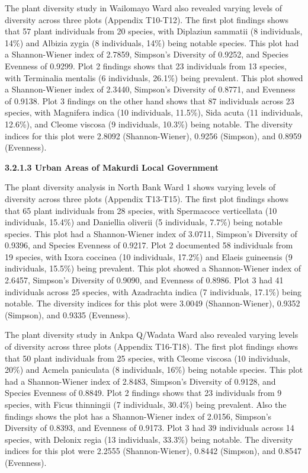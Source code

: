 The plant diversity study in Wailomayo Ward also revealed varying levels of diversity across three plots (Appendix T10-T12). The first plot findings shows that 57 plant individuals from 20 species, with Diplaziun sammatii (8 individuals, 14\%) and Albizia zygia (8 individuals, 14\%) being notable species. This plot had a Shannon-Wiener index of 2.7859, Simpson's Diversity of 0.9252, and Species Evenness of 0.9299. Plot 2 findings shows that 23 individuals from 13 species, with Terminalia mentalis (6 individuals, 26.1\%) being prevalent. This plot showed a Shannon-Wiener index of 2.3440, Simpson's Diversity of 0.8771, and Evenness of 0.9138. Plot 3 findings on the other hand shows that 87 individuals across 23 species, with Magnifera indica (10 individuals, 11.5\%), Sida acuta (11 individuals, 12.6\%), and Cleome viscosa (9 individuals, 10.3\%) being notable. The diversity indices for this plot were 2.8092 (Shannon-Wiener), 0.9256 (Simpson), and 0.8959 (Evenness).

{}\textbf{3.2.1.3 Urban Areas of Makurdi Local Government}

The plant diversity analysis in North Bank Ward 1 shows varying levels of diversity across three plots (Appendix T13-T15). The first plot findings shows that 65 plant individuals from 28 species, with Spermacoce verticellata (10 individuals, 15.4\%) and Daniellia oliverii (5 individuals, 7.7\%) being notable species. This plot had a Shannon-Wiener index of 3.0711, Simpson's Diversity of 0.9396, and Species Evenness of 0.9217. Plot 2 documented 58 individuals from 19 species, with Ixora coccinea (10 individuals, 17.2\%) and Elaeis guineensis (9 individuals, 15.5\%) being prevalent. This plot showed a Shannon-Wiener index of 2.6457, Simpson's Diversity of 0.9090, and Evenness of 0.8986. Plot 3 had 41 individuals across 25 species, with Azadrachta indica (7 individuals, 17.1\%) being notable. The diversity indices for this plot were 3.0049 (Shannon-Wiener), 0.9352 (Simpson), and 0.9335 (Evenness).

The plant diversity study in Ankpa Q/Wadata Ward also revealed varying levels of diversity across three plots (Appendix T16-T18). The first plot findings shows that 50 plant individuals from 25 species, with Cleome viscosa (10 individuals, 20\%) and Acmela paniculata (8 individuals, 16\%) being notable species. This plot had a Shannon-Wiener index of 2.8483, Simpson's Diversity of 0.9128, and Species Evenness of 0.8849. Plot 2 findings shows that 23 individuals from 9 species, with Ficus thinningii (7 individuals, 30.4\%) being prevalent. Also the findings shows the plot has a Shannon-Wiener index of 2.0156, Simpson's Diversity of 0.8393, and Evenness of 0.9173. Plot 3 had 39 individuals across 14 species, with Delonix regia (13 individuals, 33.3\%) being notable. The diversity indices for this plot were 2.2555 (Shannon-Wiener), 0.8442 (Simpson), and 0.8547 (Evenness).

